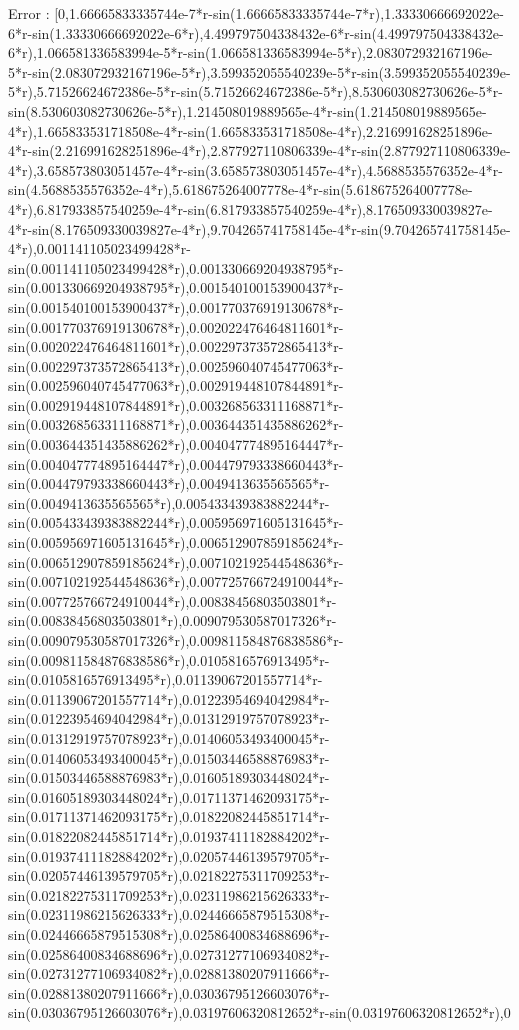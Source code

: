 \documentclass[a4paper,10pt]{article}
\begin{document}
\begin{eulernotebook}
\begin{eulercomment}
\begin{eulercomment}
\begin{eulercomment}
\begin{eulercomment}
\begin{eulercomment}
\begin{eulercomment}
\begin{eulercomment}
\begin{eulercomment}
\begin{eulercomment}
\begin{eulercomment}
\begin{eulercomment}
\begin{eulercomment}
\begin{eulercomment}
\begin{eulercomment}
\begin{eulercomment}
\begin{eulercomment}
\begin{eulercomment}
\begin{eulercomment}
\begin{euleroutput}
  Error : [0,1.66665833335744e-7*r-sin(1.66665833335744e-7*r),1.33330666692022e-6*r-sin(1.33330666692022e-6*r),4.499797504338432e-6*r-sin(4.499797504338432e-6*r),1.066581336583994e-5*r-sin(1.066581336583994e-5*r),2.083072932167196e-5*r-sin(2.083072932167196e-5*r),3.599352055540239e-5*r-sin(3.599352055540239e-5*r),5.71526624672386e-5*r-sin(5.71526624672386e-5*r),8.530603082730626e-5*r-sin(8.530603082730626e-5*r),1.214508019889565e-4*r-sin(1.214508019889565e-4*r),1.665833531718508e-4*r-sin(1.665833531718508e-4*r),2.216991628251896e-4*r-sin(2.216991628251896e-4*r),2.877927110806339e-4*r-sin(2.877927110806339e-4*r),3.658573803051457e-4*r-sin(3.658573803051457e-4*r),4.5688535576352e-4*r-sin(4.5688535576352e-4*r),5.618675264007778e-4*r-sin(5.618675264007778e-4*r),6.817933857540259e-4*r-sin(6.817933857540259e-4*r),8.176509330039827e-4*r-sin(8.176509330039827e-4*r),9.704265741758145e-4*r-sin(9.704265741758145e-4*r),0.001141105023499428*r-sin(0.001141105023499428*r),0.001330669204938795*r-sin(0.001330669204938795*r),0.001540100153900437*r-sin(0.001540100153900437*r),0.001770376919130678*r-sin(0.001770376919130678*r),0.002022476464811601*r-sin(0.002022476464811601*r),0.002297373572865413*r-sin(0.002297373572865413*r),0.002596040745477063*r-sin(0.002596040745477063*r),0.002919448107844891*r-sin(0.002919448107844891*r),0.003268563311168871*r-sin(0.003268563311168871*r),0.003644351435886262*r-sin(0.003644351435886262*r),0.004047774895164447*r-sin(0.004047774895164447*r),0.004479793338660443*r-sin(0.004479793338660443*r),0.0049413635565565*r-sin(0.0049413635565565*r),0.005433439383882244*r-sin(0.005433439383882244*r),0.005956971605131645*r-sin(0.005956971605131645*r),0.006512907859185624*r-sin(0.006512907859185624*r),0.007102192544548636*r-sin(0.007102192544548636*r),0.007725766724910044*r-sin(0.007725766724910044*r),0.00838456803503801*r-sin(0.00838456803503801*r),0.009079530587017326*r-sin(0.009079530587017326*r),0.009811584876838586*r-sin(0.009811584876838586*r),0.0105816576913495*r-sin(0.0105816576913495*r),0.01139067201557714*r-sin(0.01139067201557714*r),0.01223954694042984*r-sin(0.01223954694042984*r),0.01312919757078923*r-sin(0.01312919757078923*r),0.01406053493400045*r-sin(0.01406053493400045*r),0.01503446588876983*r-sin(0.01503446588876983*r),0.01605189303448024*r-sin(0.01605189303448024*r),0.01711371462093175*r-sin(0.01711371462093175*r),0.01822082445851714*r-sin(0.01822082445851714*r),0.01937411182884202*r-sin(0.01937411182884202*r),0.02057446139579705*r-sin(0.02057446139579705*r),0.02182275311709253*r-sin(0.02182275311709253*r),0.02311986215626333*r-sin(0.02311986215626333*r),0.02446665879515308*r-sin(0.02446665879515308*r),0.02586400834688696*r-sin(0.02586400834688696*r),0.02731277106934082*r-sin(0.02731277106934082*r),0.02881380207911666*r-sin(0.02881380207911666*r),0.03036795126603076*r-sin(0.03036795126603076*r),0.03197606320812652*r-sin(0.03197606320812652*r),0
\end{euleroutput}
\end{eulercomment}
\end{eulercomment}
\end{eulercomment}
\end{eulercomment}
\end{eulercomment}
\end{eulercomment}
\end{eulercomment}
\end{eulercomment}
\end{eulercomment}
\end{eulercomment}
\end{eulercomment}
\end{eulercomment}
\end{eulercomment}
\end{eulercomment}
\end{eulercomment}
\end{eulercomment}
\end{eulercomment}
\end{eulercomment}
\end{eulernotebook}
\end{document}
